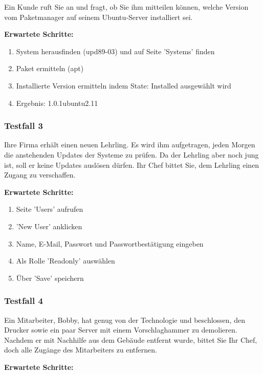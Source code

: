Ein Kunde ruft Sie an und fragt, ob Sie ihm mitteilen können, welche Version vom Paketmanager auf seinem Ubuntu-Server installiert sei.

\bigskip
\textbf{Erwartete Schritte:}

\begin{enumerate}
    \item System herausfinden (upd89-03) und auf Seite 'Systems' finden
    \item Paket ermitteln (apt)
    \item Installierte Version ermitteln indem State: Installed ausgewählt wird
    \item Ergebnis: 1.0.1ubuntu2.11
\end{enumerate}


\subsubsection*{Testfall 3}

Ihre Firma erhält einen neuen Lehrling. Es wird ihm aufgetragen, jeden Morgen die anstehenden Updates der Systeme zu prüfen. Da der Lehrling aber noch jung ist, soll er keine Updates auslösen dürfen. Ihr Chef bittet Sie, dem Lehrling einen Zugang zu verschaffen.

\bigskip
\textbf{Erwartete Schritte:}

\begin{enumerate}
    \item Seite 'Users' aufrufen
    \item 'New User' anklicken
    \item Name, E-Mail, Passwort und Passwortbestätigung eingeben
    \item Als Rolle 'Readonly' auswählen
    \item Über 'Save' speichern
\end{enumerate}


\subsubsection*{Testfall 4}

Ein Mitarbeiter, Bobby, hat genug von der Technologie und beschlossen, den Drucker sowie ein paar Server mit einem Vorschlaghammer zu demolieren. Nachdem er mit Nachhilfe aus dem Gebäude entfernt wurde, bittet Sie Ihr Chef, doch alle Zugänge des Mitarbeiters zu entfernen.

\bigskip
\textbf{Erwartete Schritte:}

